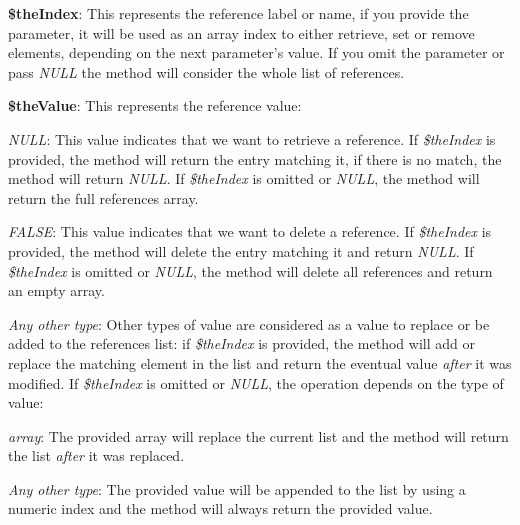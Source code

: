 \begin{DoxyItemize}
\item {\bfseries \$the\-Index}\-: This represents the reference label or name, if you provide the parameter, it will be used as an array index to either retrieve, set or remove elements, depending on the next parameter's value. If you omit the parameter or pass {\itshape N\-U\-L\-L} the method will consider the whole list of references. 
\item {\bfseries \$the\-Value}\-: This represents the reference value\-: 
\begin{DoxyItemize}
\item {\itshape N\-U\-L\-L}\-: This value indicates that we want to retrieve a reference. If {\itshape \$the\-Index} is provided, the method will return the entry matching it, if there is no match, the method will return {\itshape N\-U\-L\-L}. If {\itshape \$the\-Index} is omitted or {\itshape N\-U\-L\-L}, the method will return the full references array. 
\item {\itshape F\-A\-L\-S\-E}\-: This value indicates that we want to delete a reference. If {\itshape \$the\-Index} is provided, the method will delete the entry matching it and return {\itshape N\-U\-L\-L}. If {\itshape \$the\-Index} is omitted or {\itshape N\-U\-L\-L}, the method will delete all references and return an empty array. 
\item {\itshape Any other type}\-: Other types of value are considered as a value to replace or be added to the references list\-: if {\itshape \$the\-Index} is provided, the method will add or replace the matching element in the list and return the eventual value {\itshape after} it was modified. If {\itshape \$the\-Index} is omitted or {\itshape N\-U\-L\-L}, the operation depends on the type of value\-: 
\begin{DoxyItemize}
\item {\itshape array}\-: The provided array will replace the current list and the method will return the list {\itshape after} it was replaced. 
\item {\itshape Any other type}\-: The provided value will be appended to the list by using a numeric index and the method will always return the provided value. 
\end{DoxyItemize}
\end{DoxyItemize}
\end{DoxyItemize}


